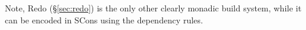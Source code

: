 
Note, Redo (\S\ref{sec:redo}) is the only other clearly monadic build
system, while it can be encoded in SCons using the dependency rules.

%
%
%
%
%
%

